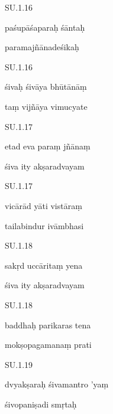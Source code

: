 \documentclass{article}
\begin{document}
	    
		SU.1.16 
    
	    
		paśupāśaparaḥ śāntaḥ 
    
	    
		paramajñānadeśikaḥ 
    

    
	
	    
		SU.1.16 
    
	    
		śivaḥ śivāya bhūtānāṃ 
    
	    
		taṃ vijñāya vimucyate 
    

    
	
	    
		SU.1.17 
    
	    
		etad eva paraṃ jñānaṃ 
    
	    
		śiva ity akṣaradvayam 
    

    
	
	    
		SU.1.17 
    
	    
		vicārād yāti vistāraṃ 
    
	    
		tailabindur ivāmbhasi 
    

    
	
	    
		SU.1.18 
    
	    
		sakṛd uccāritaṃ yena 
    
	    
		śiva ity akṣaradvayam 
    

    
	
	    
		SU.1.18 
    
	    
		baddhaḥ parikaras tena 
    
	    
		mokṣopagamanaṃ prati 
    

    
	
	    
		SU.1.19 
    
	    
		dvyakṣaraḥ śivamantro 'yaṃ 
    
	    
		śivopaniṣadi smṛtaḥ 
    
\end{document}
